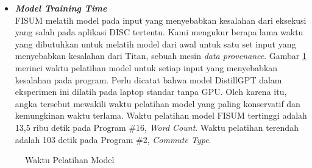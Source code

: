 \begin{itemize}
  \item \emph{\textbf{Model Training Time}} \\
  FISUM melatih model pada input yang menyebabkan 
  kesalahan dari eksekusi yang salah pada aplikasi 
  DISC tertentu. Kami mengukur berapa lama waktu 
  yang dibutuhkan untuk melatih model dari awal 
  untuk satu set input yang menyebabkan kesalahan 
  dari Titan, sebuah mesin \emph{data provenance}. 
  Gambar \ref{tb:HasilPengujianTrainTime}
  merinci waktu pelatihan model untuk setiap 
  input yang menyebabkan kesalahan pada program. 
  Perlu dicatat bahwa model DistillGPT dalam 
  eksperimen ini dilatih pada laptop standar tanpa 
  GPU. Oleh karena itu, angka tersebut mewakili 
  waktu pelatihan model yang paling konservatif 
  dan kemungkinan waktu terlama. Waktu pelatihan 
  model FISUM tertinggi adalah 13,5 ribu detik 
  pada Program \#16, \emph{Word Count}. 
  Waktu pelatihan terendah adalah 103 detik 
  pada Program \#2, \emph{Commute Type}.
\end{itemize}

\begin{figure}[H]
      \centering
      \caption{Waktu Pelatihan Model}
      \label{tb:HasilPengujianTrainTime}
\end{figure}
  

